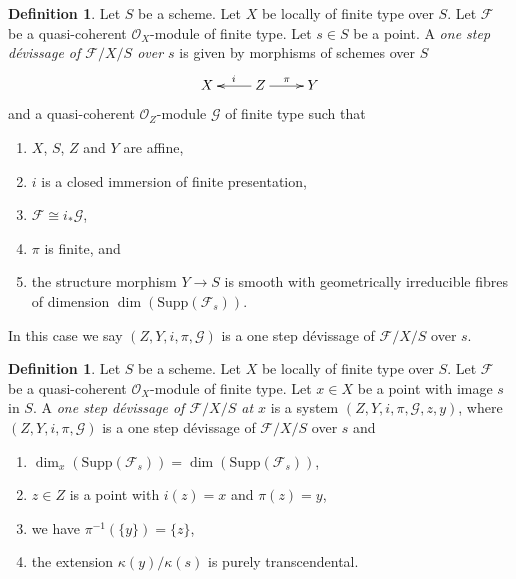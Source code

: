 \documentclass[10pt,a4paper]{amsart}
\theoremstyle{plain}
\theoremstyle{definition}
\newtheorem{definition}[subsection]{Definition}
\theoremstyle{remark}
\numberwithin{equation}{subsection}
\begin{document}
\begin{definition}
\label{definition-one-step-devissage}
Let $S$ be a scheme.
Let $X$ be locally of finite type over $S$.
Let $\mathcal{F}$ be a quasi-coherent $\mathcal{O}_X$-module of finite type.
Let $s \in S$ be a point.
A {\it one step d\'evissage of $\mathcal{F}/X/S$ over $s$}
is given by morphisms of schemes over $S$
$$
\xymatrix{
X & Z \ar[l]_i \ar[r]^\pi & Y
}
$$
and a quasi-coherent $\mathcal{O}_Z$-module $\mathcal{G}$ of finite type
such that
\begin{enumerate}
\item $X$, $S$, $Z$ and $Y$ are affine,
\item $i$ is a closed immersion of finite presentation,
\item $\mathcal{F} \cong i_*\mathcal{G}$,
\item $\pi$ is finite, and
\item the structure morphism $Y \to S$ is smooth with
geometrically irreducible fibres of
dimension $\dim(\text{Supp}(\mathcal{F}_s))$.
\end{enumerate}
In this case we say $(Z, Y, i, \pi, \mathcal{G})$ is a one step
d\'evissage of $\mathcal{F}/X/S$ over $s$.
\end{definition}

\begin{definition}
\label{definition-one-step-devissage-at-x}
Let $S$ be a scheme.
Let $X$ be locally of finite type over $S$.
Let $\mathcal{F}$ be a quasi-coherent $\mathcal{O}_X$-module of finite type.
Let $x \in X$ be a point with image $s$ in $S$.
A {\it one step d\'evissage of $\mathcal{F}/X/S$ at $x$}
is a system $(Z, Y, i, \pi, \mathcal{G}, z, y)$, where
$(Z, Y, i, \pi, \mathcal{G})$ is a one step d\'evissage of
$\mathcal{F}/X/S$ over $s$ and
\begin{enumerate}
\item $\dim_x(\text{Supp}(\mathcal{F}_s)) = \dim(\text{Supp}(\mathcal{F}_s))$,
\item $z \in Z$ is a point with $i(z) = x$ and $\pi(z) = y$,
\item we have $\pi^{-1}(\{y\}) = \{z\}$,
\item the extension $\kappa(y)/\kappa(s)$ is purely
transcendental.
\end{enumerate}
\end{definition}
\end{document}
